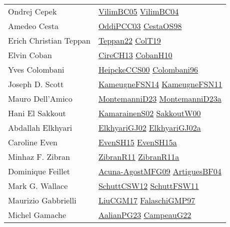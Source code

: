{\begin{longtable}{p{4cm}p{20cm}}
Ondrej Cepek & \href{articles/VilimBC05.pdf}{VilimBC05}\cite{VilimBC05} \href{papers/VilimBC04.pdf}{VilimBC04}\cite{VilimBC04} \\
Amedeo Cesta & \href{papers/OddiPCC03.pdf}{OddiPCC03}\cite{OddiPCC03} \href{papers/CestaOS98.pdf}{CestaOS98}\cite{CestaOS98} \\
Erich Christian Teppan & \href{}{Teppan22}\cite{Teppan22} \href{papers/ColT19.pdf}{ColT19}\cite{ColT19} \\
Elvin Coban & \href{papers/CireCH13.pdf}{CireCH13}\cite{CireCH13} \href{papers/CobanH10.pdf}{CobanH10}\cite{CobanH10} \\
Yves Colombani & \href{articles/HeipckeCCS00.pdf}{HeipckeCCS00}\cite{HeipckeCCS00} \href{papers/Colombani96.pdf}{Colombani96}\cite{Colombani96} \\
Joseph D. Scott & \href{articles/KameugneFSN14.pdf}{KameugneFSN14}\cite{KameugneFSN14} \href{papers/KameugneFSN11.pdf}{KameugneFSN11}\cite{KameugneFSN11} \\
Mauro Dell'Amico & \href{articles/MontemanniD23.pdf}{MontemanniD23}\cite{MontemanniD23} \href{articles/MontemanniD23a.pdf}{MontemanniD23a}\cite{MontemanniD23a} \\
Hani El Sakkout & \href{papers/KamarainenS02.pdf}{KamarainenS02}\cite{KamarainenS02} \href{articles/SakkoutW00.pdf}{SakkoutW00}\cite{SakkoutW00} \\
Abdallah Elkhyari & \href{papers/ElkhyariGJ02.pdf}{ElkhyariGJ02}\cite{ElkhyariGJ02} \href{papers/ElkhyariGJ02a.pdf}{ElkhyariGJ02a}\cite{ElkhyariGJ02a} \\
Caroline Even & \href{papers/EvenSH15.pdf}{EvenSH15}\cite{EvenSH15} \href{articles/EvenSH15a.pdf}{EvenSH15a}\cite{EvenSH15a} \\
Minhaz F. Zibran & \href{papers/ZibranR11.pdf}{ZibranR11}\cite{ZibranR11} \href{papers/ZibranR11a.pdf}{ZibranR11a}\cite{ZibranR11a} \\
Dominique Feillet & \href{papers/Acuna-AgostMFG09.pdf}{Acuna-AgostMFG09}\cite{Acuna-AgostMFG09} \href{papers/ArtiguesBF04.pdf}{ArtiguesBF04}\cite{ArtiguesBF04} \\
Mark G. Wallace & \href{papers/SchuttCSW12.pdf}{SchuttCSW12}\cite{SchuttCSW12} \href{articles/SchuttFSW11.pdf}{SchuttFSW11}\cite{SchuttFSW11} \\
Maurizio Gabbrielli & \href{papers/LiuCGM17.pdf}{LiuCGM17}\cite{LiuCGM17} \href{articles/FalaschiGMP97.pdf}{FalaschiGMP97}\cite{FalaschiGMP97} \\
Michel Gamache & \href{papers/AalianPG23.pdf}{AalianPG23}\cite{AalianPG23} \href{articles/CampeauG22.pdf}{CampeauG22}\cite{CampeauG22} \\

\end{longtable}}
